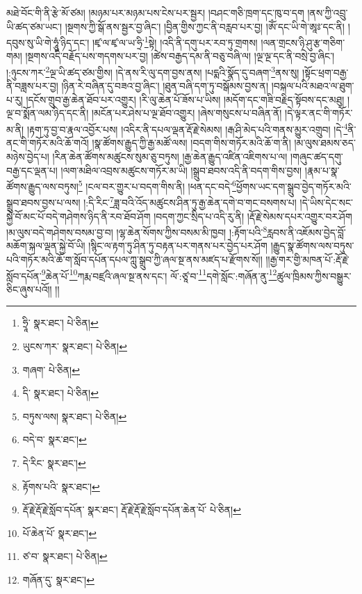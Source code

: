 མཐེ་བོང་གི་ནི་རྩེ་མོ་ཙམ། །མཉམ་པར་མཉམ་པས་ངེས་པར་སྦྱར། །བཤང་གཅི་ཁྲག་དང་ཁུ་བ་དག །ནས་ཀྱི་འབྲུ་ཡི་ཚད་ཙམ་ཡང་། །སྔགས་ཀྱི་སྒོ་ནས་སྦྱར་བྱ་ཞིང་། །བྱིན་གྱིས་ཀྱང་ནི་བརླབ་པར་བྱ། །ཨོཾ་དང་ཡི་གེ་ཨཱཿ་དང་ནི། །དབུས་སུ་ཡི་གེ་ཧཱུཾ་ཉིད་དང་། །ཛྭ་ལ་ཛྭ་ལ་ཡ་ཧྲི་\footnote{ཧྲཱི་  སྣར་ཐང་།  པེ་ཅིན། }སྟེ། །འདི་ནི་དགུ་པར་རབ་ཏུ་གྲགས། །ལན་གྲངས་ཉི་ཤུ་རྩ་གཅིག་གམ། །སྔགས་འདི་བརྗོད་པས་གདགས་པར་བྱ། །ཚེས་བརྒྱད་དམ་ནི་བཅུ་བཞི་ལ། །ལྔ་ལྔ་དང་ནི་བསྲེ་བྱ་ཞིང་། །:ཉུངས་ཀར་\footnote{ཡུངས་ཀར་  སྣར་ཐང་།  པེ་ཅིན། }ལྔ་ཡི་ཚད་ཙམ་གྱིས། །དེ་ནས་རི་ལུ་དག་བྱས་ནས། །པདྨའི་སྣོད་དུ་བཞག་\footnote{གཞག་  པེ་ཅིན། }ནས་སུ། །སྟོང་ཕྲག་བརྒྱ་ནི་བཟླས་པར་བྱ། །ཉིན་རེ་བཞིན་དུ་བཟའ་བྱ་ཞིང་། །ཐུན་བཞི་དག་ཏུ་བསྒོམས་བྱས་ན། །བསྐལ་པའི་མཐའ་ལ་ཐུག་པ་རུ། །དངོས་གྲུབ་རྒྱ་ཆེན་ཐོབ་པར་འགྱུར། །རི་ལུ་ཆེན་པོ་ཟོས་པ་ཡིས། །མདོག་དང་གཟི་བརྗིད་སྟོབས་དང་མཐུ། །ལྔ་བ་སྨོན་ལམ་ཉིད་དང་ནི། །མངོན་པར་ཤེས་པ་ལྔ་ཐོབ་འགྱུར། །ཞེས་གསུངས་པ་བཞིན་ནོ། །དེ་ལྟར་ནང་གི་གཏོར་མ་ནི། །རྟག་ཏུ་བྱ་བ་རྣལ་འབྱོར་པས། །འདིར་ནི་དཔལ་ལྡན་རྡོ་རྗེ་སེམས། །རྒ་ཤི་མེད་པའི་གནས་མྱུར་འགྲུབ། །དེ་\footnote{དི་  སྣར་ཐང་།  པེ་ཅིན། }ནི་ནང་གི་གཏོར་མའི་ཆོ་གའོ། །སྣ་ཚོགས་རྒྱུད་ཀྱི་རྒྱ་མཚོ་ལས། །བདག་གིས་གཏོར་མའི་ཆོ་ག་ནི། །མ་ལུས་ཐམས་ཅད་མཉེས་བྱེད་པ། །རིན་ཆེན་ཚོགས་མཚུངས་སུམ་ཅུ་བཏུས། །རྒྱ་ཆེན་རྒྱུད་འཛིན་འཇིགས་པ་ལ། །གཞུང་ཚད་དགུ་བརྒྱ་དང་ལྡན་པ། །ལག་མཐིལ་འབྲས་མཚུངས་གཏོར་མ་ཡི། །སྒྲུབ་ཐབས་འདི་ནི་བདག་གིས་བྱས། །རྣམ་པ་སྣ་ཚོགས་རྒྱུད་ལས་བཏུས།\footnote{བཏུས་ལས།  སྣར་ཐང་།  པེ་ཅིན། } །ངལ་བར་གྱུར་པ་བདག་གིས་ནི། །ཕན་དང་བདེ་\footnote{བདེ་བ་  སྣར་ཐང་། }ཕྱོགས་ཡང་དག་སྒྲུབ་བྱེད་གཏོར་མའི་སྒྲུབ་ཐབས་བྱས་པ་ལས། །:དི་རིང་\footnote{དེ་རིང་  སྣར་ཐང་། }ཟླ་བའི་འོད་མཚུངས་ཤིན་ཏུ་རྒྱ་ཆེན་དགེ་བ་གང་བསགས་པ། །དེ་ཡིས་དེང་སང་སྐྱེ་བོ་མང་པོ་བདེ་གཤེགས་ཉིད་ནི་རབ་ཐོབ་ཤོག །བདག་ཀྱང་སྲིད་པ་འདི་རུ་ནི། །རྡོ་རྗེ་སེམས་དཔར་འགྱུར་བར་ཤོག །མ་ལུས་བདེ་གཤེགས་བསམ་བྱ་བ། །ལྷ་ཆེན་སོགས་ཀྱིས་བསམ་མི་ཁྱབ། །:རྟོག་པའི་\footnote{རྟོགས་པའི་  སྣར་ཐང་། }རླབས་ནི་འཇོམས་བྱེད་བློ་མཆོག་སྐལ་ལྡན་སྐྱེ་བོ་ཡི། །སྙིང་ལ་རྟག་ཏུ་ཤིན་ཏུ་བརྟན་པར་གནས་པར་བྱེད་པར་ཤོག །རྒྱུད་སྣ་ཚོགས་ལས་བཏུས་པའི་གཏོར་མའི་ཆོ་ག་སློབ་དཔོན་དཔལ་ཀླུ་སྒྲུབ་ཀྱི་ཞལ་སྔ་ནས་མཛད་པ་རྫོགས་སོ།། །།རྒྱ་གར་གྱི་མཁན་པོ་:རྡོ་རྗེ་སློབ་དཔོན་\footnote{རྡོ་རྗེ་རྡོ་རྗེ་སློབ་དཔོན་  སྣར་ཐང་། རྡོ་རྗེ་རྡོ་རྗེ་སློབ་དཔོན་ཆེན་པོ་  པེ་ཅིན། }ཆེན་པོ་\footnote{པོ་ཆེན་པོ་  སྣར་ཐང་། }ཀརྨ་བཛྲའི་ཞལ་སྔ་ནས་དང་། ལོ་:ཙཱ་བ་\footnote{ཙ་བ་  སྣར་ཐང་།  པེ་ཅིན། }དགེ་སློང་:གཞོན་ནུ་\footnote{གཞོན་དུ་  སྣར་ཐང་། }ཚུལ་ཁྲིམས་ཀྱིས་བསྒྱུར་ཅིང་ཞུས་པའོ།། །།